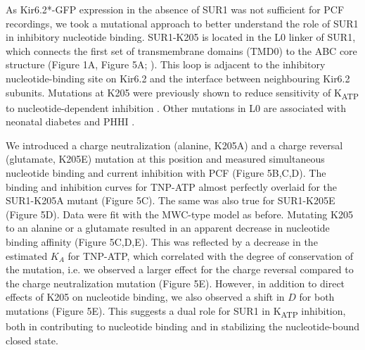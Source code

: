 \documentclass[10pt,lineno, doublespacing]{elife_modified}
\begin{document}
As Kir6.2*-GFP expression in the absence of SUR1 was not sufficient for PCF recordings, we took a mutational approach to better understand the role of SUR1 in inhibitory nucleotide binding.
SUR1-K205 is located in the L0 linker of SUR1, which connects the first set of transmembrane domains (TMD0) to the ABC core structure (Figure 1A, Figure 5A; \cite{RN6, RN7}).
This loop is adjacent to the inhibitory nucleotide-binding site on Kir6.2 and the interface between neighbouring Kir6.2 subunits.
Mutations at K205 were previously shown to reduce sensitivity of K\textsubscript{ATP} to nucleotide-dependent inhibition \citep{RN95, RN96}.
Other mutations in L0 are associated with neonatal diabetes \citep{RN15} and PHHI \citep{RN100}.

We introduced a charge neutralization (alanine, K205A) and a charge reversal (glutamate, K205E) mutation at this position and measured simultaneous nucleotide binding and current inhibition with PCF (Figure 5B,C,D).
The binding and inhibition curves for TNP-ATP almost perfectly overlaid for the SUR1-K205A mutant (Figure 5C).
The same was also true for SUR1-K205E (Figure 5D).
Data were fit with the MWC-type model as before.
Mutating K205 to an alanine or a glutamate resulted in an apparent decrease in nucleotide binding affinity (Figure 5C,D,E).
This was reflected by a decrease in the estimated $K_A$ for TNP-ATP, which correlated with the degree of conservation of the mutation, i.e. we observed a larger effect for the charge reversal compared to the charge neutralization mutation (Figure 5E).
However, in addition to direct effects of K205 on nucleotide binding, we also observed a shift in $D$ for both mutations (Figure 5E).
This suggests a dual role for SUR1 in K\textsubscript{ATP} inhibition, both in contributing to nucleotide binding and in stabilizing the nucleotide-bound closed state.
\end{document}
